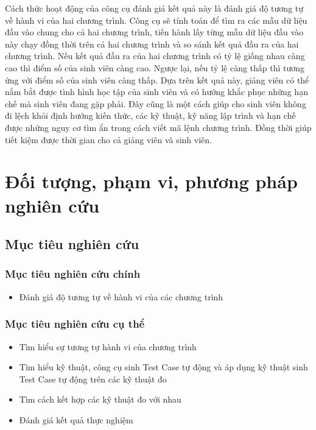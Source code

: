 Cách thức hoạt động của công cụ đánh giá kết quả này là đánh giá độ tương tự về hành vi của hai chương trình. Công cụ sẽ tính toán để tìm ra các mẫu dữ liệu đầu vào chung cho cả hai chương trình, tiến hành lấy từng mẫu dữ liệu đầu vào này chạy đồng thời trên cả hai chương trình và so sánh kết quả đầu ra của hai chương trình. Nếu kết quả đầu ra của hai chương trình có tỷ lệ giống nhau càng cao thì điểm số của sinh viên càng cao. Ngược lại, nếu tỷ lệ càng thấp thì tương ứng với điểm số của sinh viên càng thấp. Dựa trên kết quả này, giảng viên có thể nắm bắt được tình hình học tập của sinh viên và có hướng khắc phục những hạn chế mà sinh viên đang gặp phải. Đây cũng là một cách giúp cho sinh viên không đi lệch khỏi định hướng kiến thức, các kỹ thuật, kỹ năng lập trình và hạn chế được những nguy cơ tìm ẩn trong cách viết mã lệnh chương trình. Đồng thời giúp tiết kiệm được thời gian cho cả giảng viên và sinh viên.

\section{Đối tượng, phạm vi, phương pháp nghiên cứu}

	\subsection*{Mục tiêu nghiên cứu}
		\subsubsection*{Mục tiêu nghiên cứu chính}
		\begin{itemize}
		\item Đánh giá độ tương tự về hành vi của các chương trình
		\end{itemize}
		
		\subsubsection*{Mục tiêu nghiên cứu cụ thể}
		\begin{itemize}
		\item Tìm hiểu sự tương tự hành vi của chương trình
		\item Tìm hiểu kỹ thuật, công cụ sinh Test Case tự động và áp dụng kỹ thuật sinh Test Case tự động trên các kỹ thuật đo
		\item Tìm cách kết hợp các kỹ thuật đo với nhau
		\item Đánh giá kết quả thực nghiệm
		\end{itemize}

